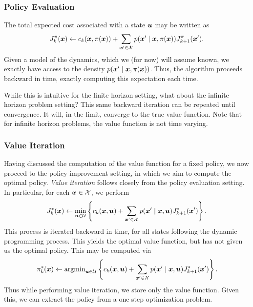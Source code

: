 \subsubsection{Policy Evaluation}

The total expected cost associated with a state $\bm{u}$ may be written as 
\begin{equation}
    J_k^{\pi}(\bm{x}) \gets c_k(\bm{x}, \pi(\bm{x})) + \sum_{\bm{x}' \in \mathcal{X}} p(\bm{x}' \mid \bm{x}, \pi(\bm{x})) J^{\pi}_{k+1}(\bm{x}'). 
\end{equation}
Given a model of the dynamics, which we (for now) will assume known, we exactly have access to the density $p(\bm{x}' \mid \bm{x}, \pi(\bm{x}))$. Thus, the algorithm proceeds backward in time, exactly computing this expectation each time. 

While this is intuitive for the finite horizon setting, what about the infinite horizon problem setting? This same backward iteration can be repeated until convergence. It will, in the limit, converge to the true value function. Note that for infinite horizon problems, the value function is not time varying.

\subsubsection{Value Iteration}

Having discussed the computation of the value function for a fixed policy, we now proceed to the policy improvement setting, in which we aim to compute the optimal policy. \textit{Value iteration} follows closely from the policy evaluation setting. In particular, for each $\bm{x} \in \mathcal{X}$, we perform
\begin{equation}
    J^*_k(\bm{x}) \gets \min_{\bm{u} \in \mathcal{U}} \left\{c_k(\bm{x}, \bm{u}) + \sum_{\bm{x}' \in \mathcal{X}} p(\bm{x}' \mid \bm{x}, \bm{u}) J^*_{k+1}(\bm{x}') \right\}. \label{eq:value_itr}
\end{equation}
This process is iterated backward in time, for all states following the dynamic programming process. This yields the optimal value function, but has not given us the optimal policy. This may be computed via 
\begin{equation}
    \pi^*_k(\bm{x}) \gets \text{argmin}_{\bm{u} \in \mathcal{U}} \left\{c_k(\bm{x}, \bm{u}) + \sum_{\bm{x}' \in \mathcal{X}} p(\bm{x}' \mid \bm{x}, \bm{u}) J^*_{k+1}(\bm{x}') \right\}. 
\end{equation}
Thus while performing value iteration, we store only the value function. Given this, we can extract the policy from a one step optimization problem. 

